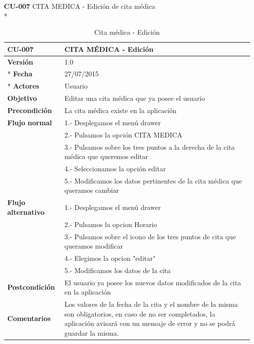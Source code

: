 \documentclass[../pfc.tex]{subfiles}
\begin{document}
	
	\textbf{CU-007}	CITA MEDICA - Edición de cita médica\\*
	
		\begin{table}[H]
			\centering
			\begin{tabular}[t]{|p{3cm}|p{9.5cm}|}
				\hline \textbf{CU-007} & \textbf{CITA MÉDICA - Edición} \\*
				\hline\hline \textbf{Versión} & 1.0 \\ *
				\hline\hline \textbf{Fecha} & 27/07/2015 \\ *
				\hline\textbf{Actores} 	& Usuario\\*
				\hline \textbf{Objetivo} & Editar una cita médica que ya posee el usuario\\* 			
				\hline \textbf{Precondición} & La cita médica existe en la aplicación\\* 
				\hline \textbf{Flujo normal} & 1.- Desplegamos el menú drawer \\* 
				& 2.- Pulsamos la opción CITA MEDICA\\*	
				& 3.- Pulsamos sobre los tres puntos a la derecha de la cita médica que queremos editar\\*	
				& 4.- Seleccionamos la opción editar\\*	
				& 5.- Modificamos los datos pertinentes de la cita médica que queramos cambiar\\*	
				\hline \textbf{Flujo alternativo} & 1.- Desplegamos el menú drawer \\* 
				& 2.- Pulsamos la opcion Horario \\*	
				& 3.- Pulsamos sobre el icono de los tres puntos de cita que queramos modificar \\*	
				& 4.- Elegimos la opcion "editar"\\*	
				& 5.- Modificamos los datos de la cita\\*	
				\hline \textbf{Postcondición} & El usuario ya posee los nuevos datos modificados de la cita en la aplicación \\* 
				\hline \textbf{Comentarios}   & Los valores de la fecha de la cita y el nombre de la misma son obligatorios, en caso de no ser completados, la aplicación avisará con un mensaje de error y no se podrá guardar la misma.\\*
				\hline
			\end{tabular}
			\caption{Cita médica - Edición}
			\label{tabla:caso007}
		\end{table}
		
	
	
\end{document}
